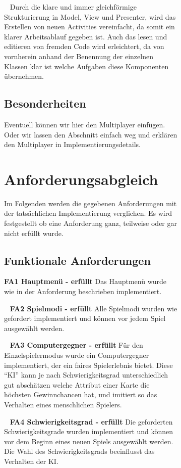 \documentclass{scrartcl}
\begin{document}
\begin{figure}[!ht]
\begin{figure}[!ht]
\ \newline
Durch die klare und immer gleichförmige Strukturierung in Model, View und
Presenter, wird das Erstellen von neuen Activities vereinfacht, da somit ein
klarer Arbeitsablauf gegeben ist. Auch das lesen und editieren von fremden Code
wird erleichtert, da von vornherein anhand der Benennung der einzelnen Klassen
klar ist welche Aufgaben diese Komponenten übernehmen.

\subsection{Besonderheiten}

Eventuell können wir hier den Multiplayer einfügen. Oder wir lassen den
Abschnitt einfach weg und erklären den Multiplayer in Implementierungsdetails.

\section{Anforderungsabgleich}

Im Folgenden werden die gegebenen Anforderungen mit der tatsächlichen
Implementierung verglichen. Es wird festgestellt ob eine Anforderung ganz,
teilweise oder gar nicht erfüllt wurde.

\subsection{Funktionale Anforderungen}

\textbf{FA1 Hauptmenü - erfüllt} \newline
Das Hauptmenü wurde wie in der Anforderung beschrieben implementiert.

\ \newline
\textbf{FA2 Spielmodi - erfüllt} \newline
Alle Spielmodi wurden wie gefordert implementiert und können vor jedem Spiel
ausgewählt werden.

\ \newline
\textbf{FA3 Computergegner - erfüllt} \newline
Für den Einzelspielermodus wurde ein Computergegner implementiert, der ein
faires Spielerlebnis bietet. Diese \enquote{KI} kann je nach Schwierigkeitsgrad
unterschiedlich gut abschätzen welche Attribut einer Karte die höchsten
Gewinnchancen hat, und imitiert so das Verhalten eines menschlichen Spielers.

\ \newline
\textbf{FA4 Schwierigkeitsgrad - erfüllt} \newline
Die geforderten Schwierigkeitsgrade wurden implementiert und können vor dem
Beginn eines neuen Spiels ausgewählt werden. Die Wahl des Schwierigkeitsgrads
beeinflusst das Verhalten der KI.


\end{figure}
\end{figure}
\end{document}
